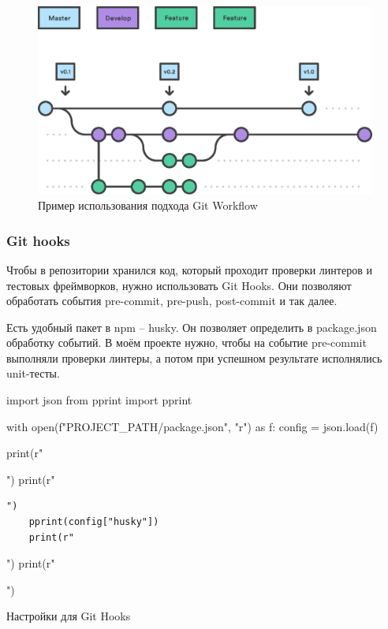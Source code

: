 \begin{figure}[h!]
    \begin{center}
        \includegraphics[scale=0.6]{images/git-workflow.eps}
    \end{center}
    \caption{Пример использования подхода Git Workflow}
\end{figure}

\subsubsection{Git hooks}
Чтобы в репозитории хранился код, который проходит проверки линтеров и тестовых фреймворков, нужно использовать Git Hooks. Они позволяют обработать события pre-commit, pre-push, post-commit и так далее.

Есть удобный пакет в npm -- husky. Он позволяет определить в package.json обработку событий. В моём проекте нужно, чтобы на событие pre-commit выполняли проверки линтеры, а потом при успешном результате исполнялись unit-тесты.

\begin{listing}[h!]
\begin{pycode}
import json
from pprint import pprint

with open(f"{PROJECT_PATH}/package.json", "r") as f:
    config = json.load(f)

    print(r"\begin{noerr}")
    print(r"\begin{verbatim}")
    pprint(config["husky"])
    print(r"\end{verbatim}")
    print(r"\end{noerr}")
\end{pycode}
\caption{Настройки для Git Hooks}
\end{listing}

\clearpage